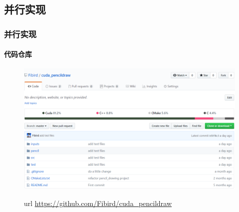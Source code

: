 \documentclass[aspectratio=43, xcolor=svgnames, t, 10pt]{beamer}
\begin{document}
\subsection{并行实现}
\begin{frame}
  \frametitle{并行实现}
  \framesubtitle{代码仓库}
  \begin{figure}
    \centering
    \includegraphics[width=\linewidth]{./figure/code_project.PNG}
    \begin{block}{url}
      \url{https://github.com/Fibird/cuda_pencildraw}
    \end{block}
  \end{figure}

\end{frame}
\end{document}
